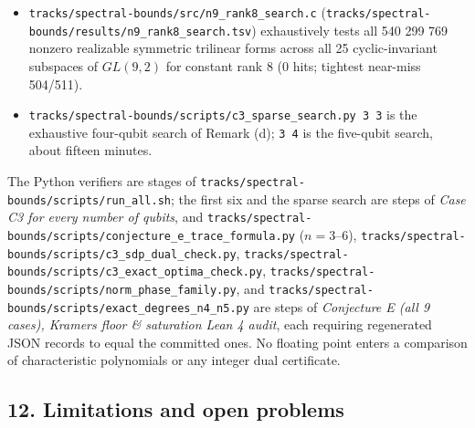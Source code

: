 \documentclass[11pt,a4paper]{article}
\begin{document}
\begin{itemize}
  (\(n_k + F(\sigma_k) \ge 315\): 28 spectral, 10 diagonal-shift, 4 triangle-cut), and a negative control
  rejecting \(F \ge 253\) on the Hoggar orbit.
\item
  \nolinkurl{tracks/spectral-bounds/src/n9_rank8_search.c} (\nolinkurl{tracks/spectral-bounds/results/n9_rank8_search.tsv}) exhaustively tests all 540 299 769 nonzero
  realizable symmetric trilinear forms across all 25 cyclic-invariant subspaces of \(GL(9,2)\) for constant
  rank 8 (0 hits; tightest near-miss 504/511).
\item
  \texttt{tracks/spectral-bounds/scripts/c3\_sparse\_search.py\ 3\ 3} is the exhaustive four-qubit search of Remark (d); \texttt{3\ 4} is the
  five-qubit search, about fifteen minutes.
\end{itemize}

The Python verifiers are stages of \nolinkurl{tracks/spectral-bounds/scripts/run_all.sh}; the first six and the sparse search are steps of
\emph{Case C3 for every number of qubits}, and \nolinkurl{tracks/spectral-bounds/scripts/conjecture_e_trace_formula.py} (\(n=3\text{–}6\)),
\nolinkurl{tracks/spectral-bounds/scripts/c3_sdp_dual_check.py}, \nolinkurl{tracks/spectral-bounds/scripts/c3_exact_optima_check.py}, \nolinkurl{tracks/spectral-bounds/scripts/norm_phase_family.py}, and
\nolinkurl{tracks/spectral-bounds/scripts/exact_degrees_n4_n5.py} are steps of \emph{Conjecture E (all 9 cases), Kramers floor \& saturation
Lean 4 audit}, each requiring regenerated JSON records to equal the committed ones. No floating point
enters a comparison of characteristic polynomials or any integer dual certificate.

\subsection{12. Limitations and open problems}\label{12-limitations-and-open-problems}
\end{document}
